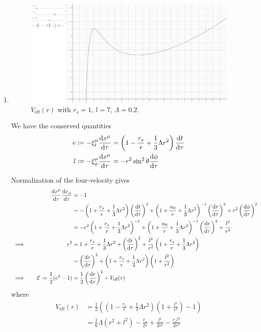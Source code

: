 \documentclass[12pt]{article}
\begin{document}
\begin{enumerate}[label=(\alph*)]
    \item 
    \begin{figure}[h]
        \includegraphics[scale=0.25]{prob2b.PNG}
        \centering
        \caption{$V_\text{eff}(r)$ with $r_s=1$, $l=7$, $\Lambda=0.2$.}
        \label{fig1}
    \end{figure}
    We have the conserved quantities
    \begin{align*}
        e \coloneqq -\xi_t^\mu\dv{x^\mu}{\tau} &= \left(1 - \frac{r_s}{r} + \frac{1}{3}\Lambda r^2\right)\dv{t}{\tau} \\
        l \coloneqq -\xi_\phi^\mu\dv{x^\mu}{\tau} &= -r^2\sin^2\theta\dv{\phi}{\tau}
    \end{align*}

    Normalization of the four-velocity gives
    \begin{alignat*}{3}
        &\quad & \dv{x^\mu}{\tau}\dv{x_\mu}{\tau} &= -1 \\
        &\quad & &= -\left(1 + \frac{r_s}{r} + \frac{1}{3}\Lambda r^2\right)\left(\dv{t}{\tau}\right)^2 + \left(1 + \frac{\alpha_0}{r} + \frac{1}{3}\Lambda r^2\right)^{-1}\left(\dv{r}{\tau}\right)^2 + r^2\left(\dv{\phi}{\tau}\right)^2 \\
        &\quad & &= -e^2\left(1 + \frac{r_s}{r} + \frac{1}{3}\Lambda r^2\right)^{-1} + \left(1 + \frac{\alpha_0}{r} + \frac{1}{3}\Lambda r^2\right)^{-1}\left(\dv{r}{\tau}\right)^2 + \frac{l^2}{r^2} \\
        &\implies\quad & e^2 &= 1 + \frac{r_s}{r} + \frac{1}{3}\Lambda r^2 + \left(\dv{r}{\tau}\right)^2 + \frac{l^2}{r^2}\left(1 + \frac{r_s}{r} + \frac{1}{3}\Lambda r^2\right) \\
        &\quad & &= \left(\dv{r}{\tau}\right)^2 + \left(1 + \frac{r_s}{r} + \frac{1}{3}\Lambda r^2\right)\left(1 + \frac{l^2}{r^2}\right) \\
        &\implies\quad & \mathcal{E} \coloneqq \frac{1}{2}(e^2 - 1) &= \frac{1}{2}\left(\dv{r}{\tau}\right)^2 + V_\text{eff}(r)
    \end{alignat*}
    where
    \begin{align*}
        V_\text{eff}(r) &= \frac{1}{2}\left(\left(1 - \frac{r_s}{r} + \frac{1}{3}\Lambda r^2\right)\left(1 + \frac{l^2}{r^2}\right) - 1\right) \\
        &= \frac{1}{6}\Lambda (r^2 + l^2) - \frac{r_s}{2r} + \frac{l^2}{2r^2} - \frac{r_sl^2}{2r^3}
    \end{align*}
\end{enumerate}
\end{document}
